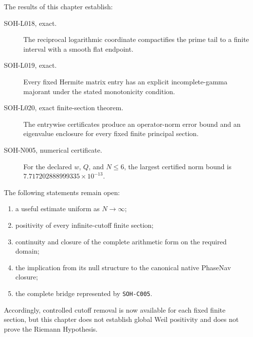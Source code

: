 The results of this chapter establish:

\begin{description}
\item[SOH-L018, exact.]
The reciprocal logarithmic coordinate compactifies the prime tail to a finite
interval with a smooth flat endpoint.

\item[SOH-L019, exact.]
Every fixed Hermite matrix entry has an explicit incomplete-gamma majorant
under the stated monotonicity condition.

\item[SOH-L020, exact finite-section theorem.]
The entrywise certificates produce an operator-norm error bound and an
eigenvalue enclosure for every fixed finite principal section.

\item[SOH-N005, numerical certificate.]
For the declared $w$, $Q$, and $N\le6$, the largest certified norm bound is
$7.717202888999335\times10^{-13}$.
\end{description}

The following statements remain open:

\begin{enumerate}
\item a useful estimate uniform as $N\to\infty$;
\item positivity of every infinite-cutoff finite section;
\item continuity and closure of the complete arithmetic form on the required
domain;
\item the implication from its null structure to the canonical native
PhaseNav closure;
\item the complete bridge represented by \texttt{SOH-C005}.
\end{enumerate}

Accordingly, controlled cutoff removal is now available for each fixed finite
section, but this chapter does not establish global Weil positivity and does
not prove the Riemann Hypothesis.
